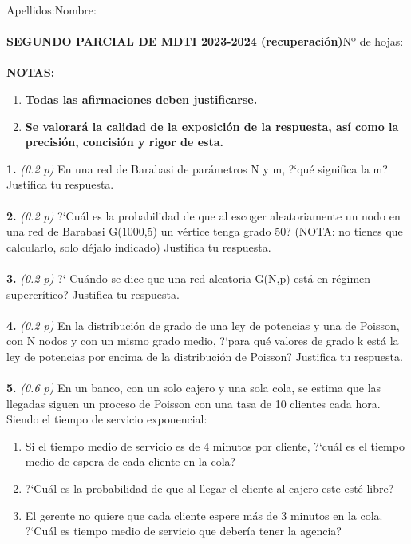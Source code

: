 \documentclass{article}
\title{\vspace{-6cm}}
\date{}
\begin{document}
\maketitle
Apellidos:\hspace{11cm}Nombre:\\\\
\hspace*{4cm}\textbf{SEGUNDO PARCIAL DE MDTI 2023-2024 (recuperación)}\hspace*{2cm}Nº de hojas:\\\\

\textbf{NOTAS:}
\begin{enumerate}
    \item\textbf{Todas las afirmaciones deben justificarse.}
    \item\textbf{Se valorará la calidad de la exposición de la respuesta, así como la precisión, concisión y rigor de esta.}
\end{enumerate}

\vspace{0.2cm}

\textbf{1.} \textit{(0.2 p)}  En  una red de Barabasi de parámetros N y m, ?`qué significa la m? Justifica tu respuesta.\\\\
\textbf{2.} \textit{(0.2 p)} ?`Cuál es la probabilidad de que al escoger aleatoriamente un nodo en una red de Barabasi G(1000,5) un vértice tenga grado 50? (NOTA: no tienes que calcularlo, solo déjalo indicado) Justifica tu respuesta.\\\\
\textbf{3.} \textit{(0.2 p)} ?` Cuándo se dice que una red aleatoria G(N,p) está en régimen supercrítico? Justifica tu respuesta.\\\\
\textbf{4.} \textit{(0.2 p)}  En la distribución de grado de una ley de potencias y una de Poisson, con N nodos y con un mismo grado medio, ?`para qué valores de grado k está la ley de potencias por encima de la  distribución de Poisson? Justifica tu respuesta.\\\\
\textbf{5.} \textit{(0.6 p)} En un banco, con un solo cajero y una sola cola, se estima que las llegadas siguen un proceso de
Poisson con una tasa de 10 clientes cada hora. Siendo el tiempo de servicio exponencial:

\begin{enumerate}
    \item  Si el tiempo medio de servicio es de 4 minutos por cliente, ?`cuál es el tiempo medio de espera de cada cliente en la cola? 
    \item  ?`Cuál es la probabilidad de que al llegar el cliente al cajero este esté libre?
    \item  El gerente no quiere que cada cliente espere más de 3 minutos en la cola. ?`Cuál es tiempo medio de servicio que  debería tener la agencia?
    
\end{enumerate}
\end{document}
